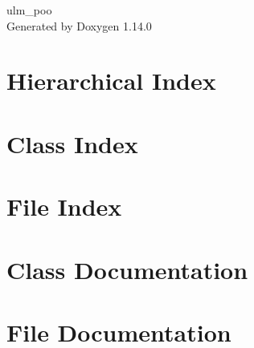 \documentclass[twoside]{book}
\newcommand{\+}{\discretionary{\mbox{\scriptsize$\hookleftarrow$}}{}{}}
\newcommand{\clearemptydoublepage}{%
    \newpage{\pagestyle{empty}\cleardoublepage}%
  }
\begin{document}
  \raggedbottom
    \hypersetup{pageanchor=false,
                bookmarksnumbered=true,
                pdfencoding=unicode
               }
  \begin{titlepage}
  \vspace*{7cm}
  \begin{center}%
  {\Large ulm\+\_\+poo}\\
  \vspace*{1cm}
  {\large Generated by Doxygen 1.14.0}\\
  \end{center}
  \end{titlepage}
  \clearemptydoublepage
  \tableofcontents
  \clearemptydoublepage
  \hypersetup{pageanchor=true}

\chapter{Hierarchical Index}

\chapter{Class Index}

\chapter{File Index}

\chapter{Class Documentation}





\chapter{File Documentation}














  \backmatter
  \newpage
  \clearemptydoublepage
  \printindex
\end{document}

